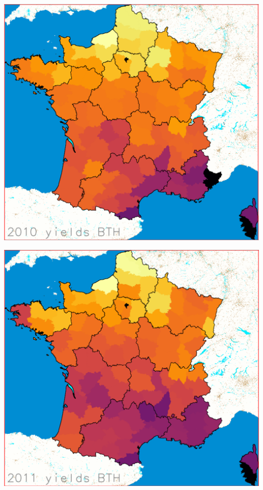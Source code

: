 \documentclass[landscape]{slides}
\begin{document}
\begin{slide} 
\includegraphics[width=\textwidth]{y2010}
\end{slide}
\begin{slide} 
\includegraphics[width=\textwidth]{y2011}
\end{slide}
\end{document}
